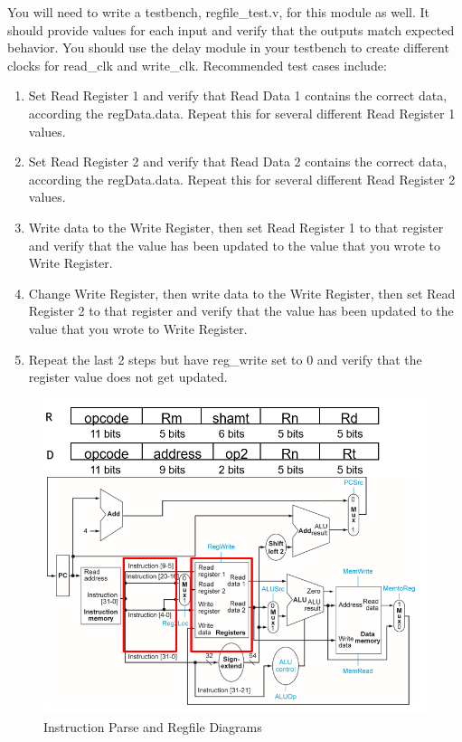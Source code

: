 You will need to write a testbench, regfile\_test.v, for this module as well.  It should provide values for each input and verify that the outputs match expected behavior.  You should use the delay module in your testbench to create different clocks for read\_clk and write\_clk.  Recommended test cases include:

\begin{enumerate}
	\item Set Read Register 1 and verify that Read Data 1 contains the correct data, according the regData.data.  Repeat this for several different Read Register 1 values.
	\item Set Read Register 2 and verify that Read Data 2 contains the correct data, according the regData.data.  Repeat this for several different Read Register 2 values.
	\item Write data to the Write Register, then set Read Register 1 to that register and verify that the value has been updated to the value that you wrote to Write Register.
	\item Change Write Register, then write data to the Write Register, then set Read Register 2 to that register and verify that the value has been updated to the value that you wrote to Write Register.
	\item Repeat the last 2 steps but have reg\_write set to 0 and verify that the register value does not get updated.
\end{enumerate} 

\begin{figure}
	\caption{Instruction Parse and Regfile Diagrams}\label{fig:register_file_cutout}
	\begin{center}
		\includegraphics[width=4.75in]{../images/register_file_cutout.png}
	\end{center}
\end{figure} 


